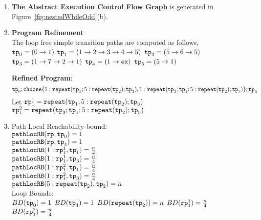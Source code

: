   \begin{enumerate}
    \item  \textbf{The Abstract Execution Control Flow Graph} is generated in Figure~\ref{fig:nestedWhileOdd}(b).
    \item \textbf{Program Refinement}
    \\
    The loop free simple transition paths are computed as follows,
      \\ 
    $\mathtt{tp}_0 = (0 \to 1)$
      \quad
      $\mathtt{tp}_1 = (1 \to 2 \to 3 \to 4 \to 5)$
      \quad
      $\mathtt{tp}_2 = (5 \to 6 \to 5)$
      \quad
      $\mathtt{tp}_3 = (1 \to 7 \to 2 \to 1)$
      \quad
      $\mathtt{tp}_4 = (1 \to \mathtt{ex})$
      \quad
      $\mathtt{tp}_5 = (5 \to 1)$

  \textbf{Refined Program}:
  \[
    \tpath_0 ; \rpchoose{1: \rprepeat(\tpath_1; 5:\rprepeat(\tpath_2); \tpath_3) , 
    1: \rprepeat(\tpath_3; \tpath_1; 5:\rprepeat(\tpath_2); \tpath_5 )}; \tpath_4
    \]
    Let $\mathtt{rp}_1^1 = \mathtt{repeat}(\mathtt{tp}_1; 5:\mathtt{repeat}(\mathtt{tp}_2); \mathtt{tp}_3)$
    \\
    $\mathtt{rp}_1^2 = \mathtt{repeat}(\mathtt{tp}_3; \mathtt{tp}_1; 5:\mathtt{repeat}(\mathtt{tp}_2) ; \mathtt{tp}_5 )$
    \item {Path Local Reachability-bound}:
    \\
    $\mathtt{pathLocRB}(\mathtt{rp}, \mathtt{tp}_0) = 1$ \\
    $\mathtt{pathLocRB}(\mathtt{rp}, \mathtt{tp}_4) = 1$ \\
    $\mathtt{pathLocRB}(1: \mathtt{rp}_1^1, \mathtt{tp}_1) = \frac{n}{4}$ \\
    $\mathtt{pathLocRB}(1: \mathtt{rp}_1^1, \mathtt{tp}_3) = \frac{n}{4}$ \\
    $\mathtt{pathLocRB}(1: \mathtt{rp}_1^2, \mathtt{tp}_1) = \frac{n}{4}$ \\
    $\mathtt{pathLocRB}(1: \mathtt{rp}_1^2, \mathtt{tp}_3) = \frac{n}{4}$ \\
    $\mathtt{pathLocRB}(5: \mathtt{repeat}(\mathtt{tp}_2), \mathtt{tp}_2) = n$ 
    \\
    Loop Bounds:
    \\
    $BD(\mathtt{tp}_0) = 1$
    \quad
    $BD(\mathtt{tp}_4) = 1$
    \quad
    $BD(\mathtt{repeat}(\mathtt{tp}_2)) = n $
    \quad
    $BD(\mathtt{rp}_1^1) = \frac{n}{4} $
    \quad
    $BD(\mathtt{rp}_1^2) = \frac{n}{4} $


\end{enumerate}
